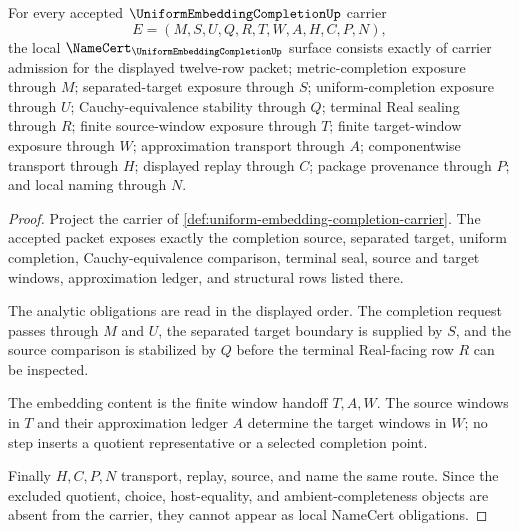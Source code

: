 \begin{theorem}
\label{thm:uniform-embedding-completion-namecert-obligations}
For every accepted $\UniformEmbeddingCompletionUp$ carrier
$$
E=(M,S,U,Q,R,T,W,A,H,C,P,N),
$$
the local $\NameCert_{\UniformEmbeddingCompletionUp}$ surface consists exactly of carrier admission for the displayed twelve-row packet; metric-completion exposure through $M$; separated-target exposure through $S$; uniform-completion exposure through $U$; Cauchy-equivalence stability through $Q$; terminal Real sealing through $R$; finite source-window exposure through $T$; finite target-window exposure through $W$; approximation transport through $A$; componentwise transport through $H$; displayed replay through $C$; package provenance through $P$; and local naming through $N$.
\end{theorem}
\begin{proof}
Project the carrier of \autoref{def:uniform-embedding-completion-carrier}. The accepted packet exposes exactly the completion source, separated target, uniform completion, Cauchy-equivalence comparison, terminal seal, source and target windows, approximation ledger, and structural rows listed there.

The analytic obligations are read in the displayed order. The completion request passes through $M$ and $U$, the separated target boundary is supplied by $S$, and the source comparison is stabilized by $Q$ before the terminal Real-facing row $R$ can be inspected.

The embedding content is the finite window handoff $T,A,W$. The source windows in $T$ and their approximation ledger $A$ determine the target windows in $W$; no step inserts a quotient representative or a selected completion point.

Finally $H,C,P,N$ transport, replay, source, and name the same route. Since the excluded quotient, choice, host-equality, and ambient-completeness objects are absent from the carrier, they cannot appear as local NameCert obligations.
\end{proof}

